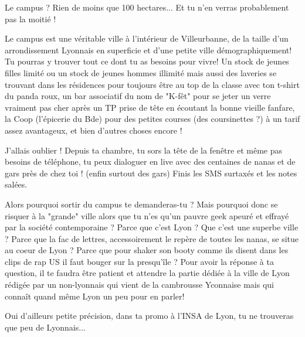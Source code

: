 Le campus ? Rien de moins que 100 hectares... Et tu n'en verras probablement pas
la moitié !

Le campus est une véritable ville à l'intérieur de Villeurbanne, de la taille
d'un arrondissement Lyonnais en superficie et d'une petite ville
démographiquement! Tu pourras y trouver tout ce dont tu as besoins pour vivre!
Un stock de jeunes filles limité ou un stock de jeunes hommes illimité mais
aussi des laveries se trouvant dans les résidences pour toujours être au top de
la classe avec ton t-shirt du panda roux, un bar associatif du nom de "K-fêt"
pour se jeter un verre vraiment pas cher après un TP prise de tête en écoutant
la bonne vieille fanfare, la Coop (l'épicerie du Bde) pour des petites courses
(des coursinettes ?) à un tarif assez avantageux, et bien d'autres choses encore
!

J'allais oublier ! Depuis ta chambre, tu sors la tête de la fenêtre et même pas
besoins de téléphone, tu peux dialoguer en live avec des centaines de nanas et
de gars près de chez toi ! (enfin surtout des gars) Finis les SMS surtaxés et
les notes salées.

Alors pourquoi sortir du campus te demanderas-tu ? Mais pourquoi donc se risquer
à la "grande" ville alors que tu n'es qu'un pauvre geek apeuré et effrayé par la
société contemporaine ? Parce que c'est Lyon ? Que c'est une superbe ville ?
Parce que la fac de lettres, accessoirement le repère de toutes les nanas, se
situe au coeur de Lyon ? Parce que pour shaker son booty comme ils disent dans
les clips de rap US il faut bouger sur la presqu'île ? Pour avoir la réponse à
ta question, il te faudra être patient et attendre la partie dédiée à la ville
de Lyon rédigée par un non-lyonnais qui vient de la cambrousse Yconnaise mais
qui connaît quand même Lyon un peu pour en parler!

Oui d'ailleurs petite précision, dans ta promo à l'INSA de Lyon, tu ne trouveras
que peu de Lyonnais... 
